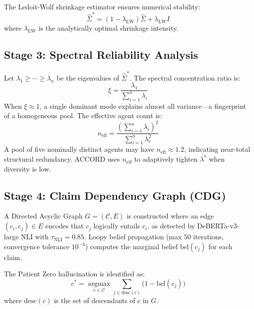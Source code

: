 \documentclass[12pt,a4paper]{report}
\begin{document}
The Ledoit-Wolf shrinkage estimator ensures numerical stability:
\begin{equation}
\hat{\Sigma}^* = (1 - \lambda_{\text{LW}})\hat{\Sigma} + \lambda_{\text{LW}} I
\end{equation}
where $\lambda_{\text{LW}}$ is the analytically optimal shrinkage intensity.

\subsection{Stage 3: Spectral Reliability Analysis}

Let $\lambda_1 \geq \cdots \geq \lambda_n$ be the eigenvalues of $\hat{\Sigma}^*$. The spectral concentration ratio is:
\begin{equation}
\xi = \frac{\lambda_1}{\sum_{i=1}^n \lambda_i}
\end{equation}
When $\xi \approx 1$, a single dominant mode explains almost all variance---a fingerprint of a homogeneous pool. The effective agent count is:
\begin{equation}
n_{\text{eff}} = \frac{\left(\sum_{i=1}^n \lambda_i\right)^2}{\sum_{i=1}^n \lambda_i^2}
\end{equation}
A pool of five nominally distinct agents may have $n_{\text{eff}} \approx 1.2$, indicating near-total structural redundancy. ACCORD uses $n_{\text{eff}}$ to adaptively tighten $\lambda^*$ when diversity is low.

\subsection{Stage 4: Claim Dependency Graph (CDG)}

A Directed Acyclic Graph $G = (\mathcal{C}, E)$ is constructed where an edge $(c_i, c_j) \in E$ encodes that $c_j$ logically entails $c_i$, as detected by DeBERTa-v3-large NLI with $\tau_{\text{NLI}} = 0.85$. Loopy belief propagation (max 50 iterations, convergence tolerance $10^{-4}$) computes the marginal belief $\text{bel}(c_j)$ for each claim.

The Patient Zero hallucination is identified as:
\begin{equation}
c^* = \operatorname*{argmax}_{c \in \mathcal{C}} \sum_{j \in \text{desc}(c)} \bigl(1 - \text{bel}(c_j)\bigr)
\end{equation}
where $\text{desc}(c)$ is the set of descendants of $c$ in $G$.
\end{document}
